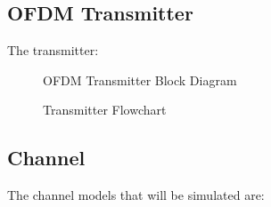 \subsection{OFDM Transmitter}
The transmitter:
\begin{figure}[htpb!]
	\centerline{\resizebox{15cm}{!}{}}
	\caption{OFDM Transmitter Block Diagram}
	\label{fig:ofdm_t_meth}
\end{figure}
\begin{figure}[htpb!]
	\centerline{}
	\caption{Transmitter Flowchart}
	\label{fig:system_transmitter}
\end{figure}

\pagebreak


\subsection{Channel}
The channel models that will be simulated are:
